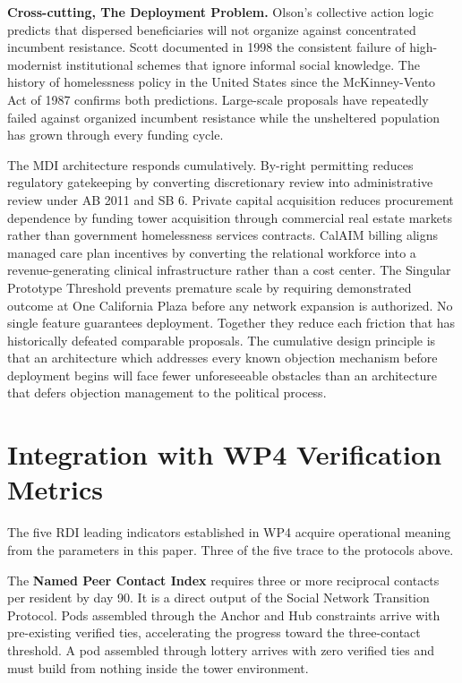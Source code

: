 \documentclass[12pt, letterpaper]{article}
\begin{document}
\textbf{Cross-cutting, The Deployment Problem.} Olson's collective action logic predicts that dispersed beneficiaries will not organize against concentrated incumbent resistance. Scott documented in 1998 the consistent failure of high-modernist institutional schemes that ignore informal social knowledge. The history of homelessness policy in the United States since the McKinney-Vento Act of 1987 confirms both predictions. Large-scale proposals have repeatedly failed against organized incumbent resistance while the unsheltered population has grown through every funding cycle.

The MDI architecture responds cumulatively. By-right permitting reduces regulatory gatekeeping by converting discretionary review into administrative review under AB 2011 and SB 6. Private capital acquisition reduces procurement dependence by funding tower acquisition through commercial real estate markets rather than government homelessness services contracts. CalAIM billing aligns managed care plan incentives by converting the relational workforce into a revenue-generating clinical infrastructure rather than a cost center. The Singular Prototype Threshold prevents premature scale by requiring demonstrated outcome at One California Plaza before any network expansion is authorized. No single feature guarantees deployment. Together they reduce each friction that has historically defeated comparable proposals. The cumulative design principle is that an architecture which addresses every known objection mechanism before deployment begins will face fewer unforeseeable obstacles than an architecture that defers objection management to the political process.


\clearpage
\section{Integration with WP4 Verification Metrics}

The five RDI leading indicators established in WP4 acquire operational meaning from the parameters in this paper. Three of the five trace to the protocols above.

The \textbf{Named Peer Contact Index} requires three or more reciprocal contacts per resident by day 90. It is a direct output of the Social Network Transition Protocol. Pods assembled through the Anchor and Hub constraints arrive with pre-existing verified ties, accelerating the progress toward the three-contact threshold. A pod assembled through lottery arrives with zero verified ties and must build from nothing inside the tower environment.
\end{document}

